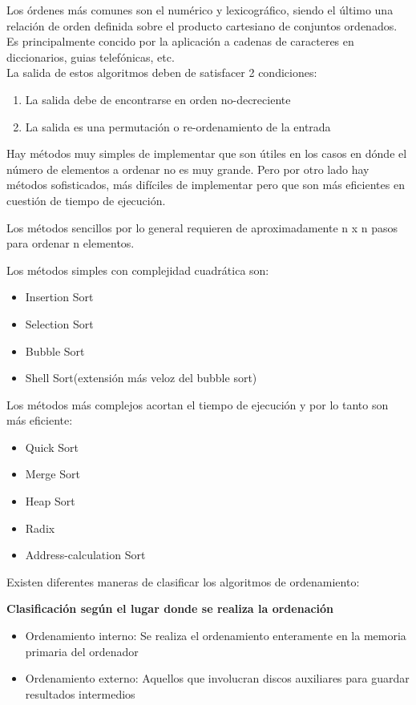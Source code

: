     Los órdenes más comunes son el numérico y lexicográfico, siendo el último una relación de orden definida sobre el producto cartesiano de conjuntos ordenados. Es principalmente concido por la aplicación a cadenas de caracteres en diccionarios, guias telefónicas, etc.\\
    
    La salida de estos algoritmos deben de satisfacer 2 condiciones:
    \begin{enumerate}
        \item La salida debe de encontrarse en orden no-decreciente
        \item La salida es una permutación o re-ordenamiento de la entrada
    \end{enumerate}
    
    Hay métodos muy simples de implementar que son útiles en los casos en dónde el número de elementos a ordenar no es muy grande. Pero por otro lado hay métodos sofisticados, más difíciles de implementar pero que son más eficientes en cuestión de tiempo de ejecución.
    
    Los métodos sencillos por lo general requieren de aproximadamente n x n pasos para ordenar n elementos.
    
    Los métodos simples con complejidad cuadrática son:
    \begin{itemize}
        \item Insertion Sort
        \item Selection Sort
        \item Bubble Sort
        \item Shell Sort(extensión más veloz del bubble sort)
    \end{itemize}
    
    Los métodos más complejos acortan el tiempo de ejecución y por lo tanto son más eficiente:
    \begin{itemize}
        \item Quick Sort
        \item Merge Sort
        \item Heap Sort
        \item Radix
        \item Address-calculation Sort
    \end{itemize}
    
    Existen diferentes maneras de clasificar los algoritmos de ordenamiento:
    
    \textbf{Clasificación según el lugar donde se realiza la ordenación}\\
    \begin{itemize}
        \item Ordenamiento interno: Se realiza el ordenamiento enteramente en la memoria primaria del ordenador
        \item Ordenamiento externo: Aquellos que involucran discos auxiliares para guardar resultados intermedios
    \end{itemize}
    
